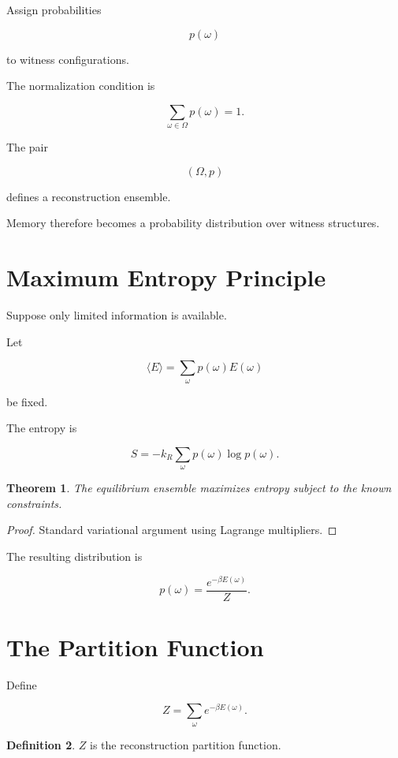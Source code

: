 \documentclass[12pt,oneside]{book}
\theoremstyle{plain} \newtheorem{theorem}{Theorem}[chapter] \newtheorem{lemma}[theorem]{Lemma} \newtheorem{proposition}[theorem]{Proposition} \newtheorem{corollary}[theorem]{Corollary}
\theoremstyle{definition} \newtheorem{definition}[theorem]{Definition} \newtheorem{axiom}[theorem]{Axiom} \newtheorem{construction}[theorem]{Construction}
\theoremstyle{remark} \newtheorem{remark}[theorem]{Remark} \newtheorem{example}[theorem]{Example}
\begin{document}
Assign probabilities

\[
p(\omega)
\]

to witness configurations.

The normalization condition is

\[
\sum_{\omega\in\Omega}
p(\omega)
=
1. 

\]

The pair

\[
(\Omega,p)
\]

defines a reconstruction ensemble.

Memory therefore becomes a probability distribution over witness structures.

\section{Maximum Entropy Principle}

Suppose only limited information is available.

Let

\[
\langle E\rangle
=
\sum_\omega
p(\omega)E(\omega)
\]

be fixed.

The entropy is

\[
S
=
-k_R
\sum_\omega
p(\omega)
\log p(\omega).
\]

\begin{theorem}

The equilibrium ensemble maximizes entropy subject to the known constraints.

\end{theorem}

\begin{proof}

Standard variational argument using Lagrange multipliers.

\end{proof}

The resulting distribution is

\[
p(\omega)
=
\frac{
e^{-\beta E(\omega)}
}
{Z}.
\]

\section{The Partition Function}

Define

\[
Z
=
\sum_\omega
e^{-\beta E(\omega)}.
\]

\begin{definition}

$Z$ is the reconstruction partition function.

\end{definition}
\end{document}
